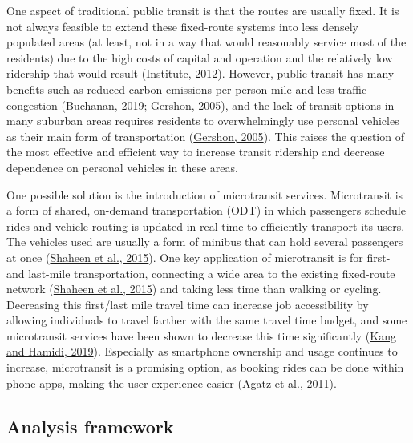 \documentclass[
]{report}
\begin{document}
One aspect of traditional public transit is that the routes are usually fixed. It is not always feasible to extend these fixed-route systems into less densely populated areas (at least, not in a way that would reasonably service most of the residents) due to the high costs of capital and operation and the relatively low ridership that would result (\protect\hyperlink{ref-MinetaTransportationInstitute2012}{Institute, 2012}). However, public transit has many benefits such as reduced carbon emissions per person-mile and less traffic congestion (\protect\hyperlink{ref-Buchanan2019}{Buchanan, 2019}; \protect\hyperlink{ref-Gershon2005}{Gershon, 2005}), and the lack of transit options in many suburban areas requires residents to overwhelmingly use personal vehicles as their main form of transportation (\protect\hyperlink{ref-Gershon2005}{Gershon, 2005}). This raises the question of the most effective and efficient way to increase transit ridership and decrease dependence on personal vehicles in these areas.

One possible solution is the introduction of microtransit services. Microtransit is a form of shared, on-demand transportation (ODT) in which passengers schedule rides and vehicle routing is updated in real time to efficiently transport its users. The vehicles used are usually a form of minibus that can hold several passengers at once (\protect\hyperlink{ref-Shaheen2015}{Shaheen et al., 2015}). One key application of microtransit is for first- and last-mile transportation, connecting a wide area to the existing fixed-route network (\protect\hyperlink{ref-Shaheen2015}{Shaheen et al., 2015}) and taking less time than walking or cycling. Decreasing this first/last mile travel time can increase job accessibility by allowing individuals to travel farther with the same travel time budget, and some microtransit services have been shown to decrease this time significantly (\protect\hyperlink{ref-Kang2019}{Kang and Hamidi, 2019}). Especially as smartphone ownership and usage continues to increase, microtransit is a promising option, as booking rides can be done within phone apps, making the user experience easier (\protect\hyperlink{ref-Agatz2011}{Agatz et al., 2011}).

\hypertarget{analysis-framework}{%
\subsection{Analysis framework}\label{analysis-framework}}
\end{document}
